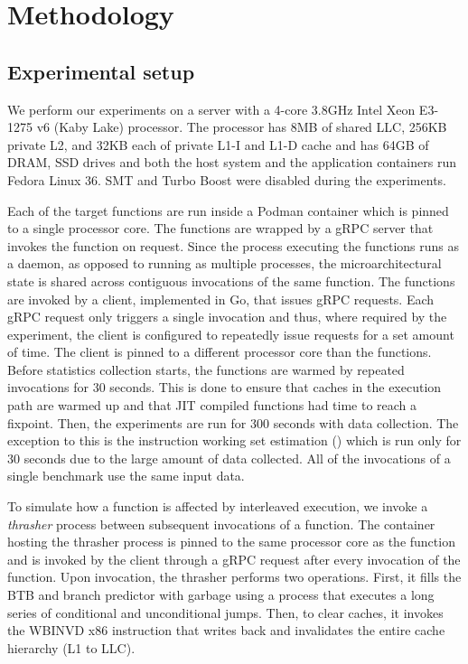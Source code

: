 \section{Methodology}
\label{sec:label}

    \subsection{Experimental setup}
We perform our experiments on a server with a 4-core 3.8GHz Intel Xeon E3-1275 v6 (Kaby Lake) processor. The processor has 8MB of shared LLC, 256KB private L2, and 32KB each of private L1-I and L1-D cache and has 64GB of DRAM, SSD drives and both the host system and the application containers run Fedora Linux 36. SMT and Turbo Boost were disabled during the experiments.

Each of the target functions are run inside a Podman container which is pinned to a single processor core. The functions are wrapped by a gRPC server that invokes the function on request. Since the process executing the functions runs as a daemon, as opposed to running as multiple processes, the microarchitectural state is shared across contiguous invocations of the same function. The functions are invoked by a client, implemented in Go, that issues gRPC requests. Each gRPC request only triggers a single invocation and thus, where required by the experiment, the client is configured to repeatedly issue requests for a set amount of time. The client is pinned to a different processor core than the functions. Before statistics collection starts, the functions are warmed by repeated invocations for 30 seconds. This is done to ensure that caches in the execution path are warmed up and that JIT compiled functions had time to reach a fixpoint. Then, the experiments are run for 300 seconds with data collection. The exception to this is the instruction working set estimation () which is run only for 30 seconds due to the large amount of data collected. All of the invocations of a single benchmark use the same input data.

To simulate how a function is affected by interleaved execution, we invoke a \emph{thrasher} process between subsequent invocations of a function. The container hosting the thrasher process is pinned to the same processor core as the function and is invoked by the client through a gRPC request after every invocation of the function. Upon invocation, the thrasher performs two operations. First, it fills the BTB and branch predictor with garbage using a process \cite{serverless_state} that executes a long series of conditional and unconditional jumps. Then, to clear caches, it invokes the WBINVD x86 instruction that writes back and invalidates the entire cache hierarchy (L1 to LLC).

